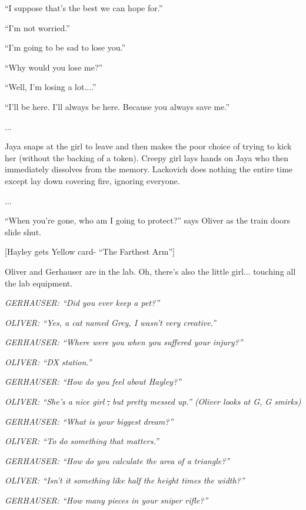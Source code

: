 ``I suppose that's the best we can hope for.''

``I'm not worried.''

``I'm going to be sad to lose you.''

``Why would you lose me?''

``Well, I'm losing a lot....''

``I'll be here.  I'll always be here.  Because you always save me.''

...

Jaya snaps at the girl to leave and then makes the poor choice of trying to kick her (without the backing of a token).  Creepy girl lays hands on Jaya who then immediately dissolves from the memory.   Lackovich does nothing the entire time except lay down covering fire, ignoring everyone. 

...

``When you're gone, who am I going to protect?'' says Oliver as the train doors slide shut.



{[}Hayley gets Yellow card- ``The Farthest Arm''{]}






Oliver and Gerhauser are in the lab.  Oh, there's also the little girl... touching all the lab equipment. 

\textit{GERHAUSER: ``Did you ever keep a pet?''}

\textit{OLIVER: ``Yes, a cat named Grey, I wasn't very creative.''}

\textit{GERHAUSER: ``Where were you when you suffered your injury?''}

\textit{OLIVER: ``DX station.''}

\textit{GERHAUSER: ``How do you feel about Hayley?''}

\textit{OLIVER: ``She's a nice girl}\sout{ \textit{,} }\textit{ but pretty messed up.'' (Oliver looks at G, G smirks)}

\textit{GERHAUSER: ``What is your biggest dream?''}

\textit{OLIVER: ``To do something that matters.''}

\textit{GERHAUSER: ``How do you calculate the area of a triangle?''}

\textit{OLIVER: ``Isn't it something like half the height times the width?''}

\textit{GERHAUSER: ``How many pieces in your sniper rifle?''}

